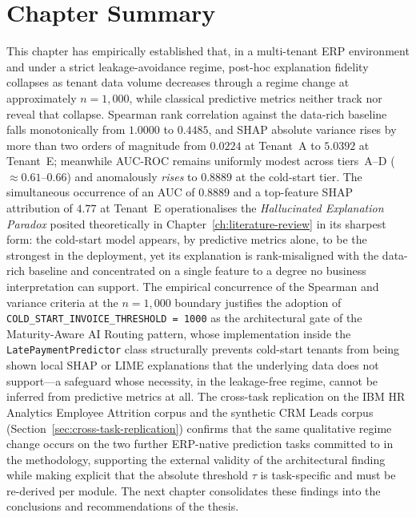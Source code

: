 \section{Chapter Summary}
\label{sec:results-summary}

This chapter has empirically established that, in a multi-tenant ERP
environment and under a strict leakage-avoidance regime, post-hoc
explanation fidelity collapses as tenant data volume decreases through a
regime change at approximately $n = 1{,}000$, while classical predictive
metrics neither track nor reveal that collapse. Spearman rank correlation
against the data-rich baseline falls monotonically from $1.0000$ to
$0.4485$, and SHAP absolute variance rises by more than two orders of
magnitude from $0.0224$ at Tenant~A to $5.0392$ at Tenant~E; meanwhile
AUC-ROC remains uniformly modest across tiers~A--D ($\approx 0.61$--$0.66$)
and anomalously \emph{rises} to $0.8889$ at the cold-start tier. The
simultaneous occurrence of an AUC of $0.8889$ and a top-feature SHAP
attribution of $4.77$ at Tenant~E operationalises the
\emph{Hallucinated Explanation Paradox} posited theoretically in
Chapter~\ref{ch:literature-review} in its sharpest form: the cold-start
model appears, by predictive metrics alone, to be the strongest in the
deployment, yet its explanation is rank-misaligned with the data-rich
baseline and concentrated on a single feature to a degree no business
interpretation can support. The empirical concurrence of the Spearman and
variance criteria at the $n = 1{,}000$ boundary justifies the adoption of
\texttt{COLD\_START\_INVOICE\_THRESHOLD = 1000} as the architectural gate
of the Maturity-Aware AI Routing pattern, whose implementation inside the
\texttt{LatePaymentPredictor} class structurally prevents cold-start
tenants from being shown local SHAP or LIME explanations that the
underlying data does not support---a safeguard whose necessity, in the
leakage-free regime, cannot be inferred from predictive metrics at all.
The cross-task replication on the IBM HR Analytics Employee Attrition
corpus and the synthetic CRM Leads corpus
(Section~\ref{sec:cross-task-replication}) confirms that the same
qualitative regime change occurs on the two further ERP-native
prediction tasks committed to in the methodology, supporting the
external validity of the architectural finding while making explicit
that the absolute threshold $\tau$ is task-specific and must be
re-derived per module.
The next chapter consolidates these findings into the conclusions and
recommendations of the thesis.
